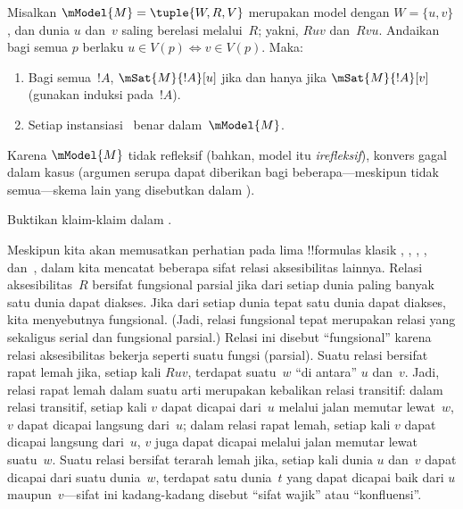 \documentclass[../../../include/open-logic-section]{subfiles}
\begin{document}
\begin{prop}
  Misalkan $\mModel{M}=\tuple{W,R,V}$ merupakan model dengan $W=\{u,v\}$,
  dan dunia $u$ dan~$v$ saling berelasi melalui~$R$; yakni, $Ruv$ dan~$Rvu$.
  Andaikan bagi semua $p$ berlaku $u\in V(p)\Leftrightarrow v\in V(p)$.
  Maka:
  \begin{enumerate}
  \item Bagi semua~$!A$, $\mSat{M}{!A}[u]$ jika dan hanya jika
    $\mSat{M}{!A}[v]$ (gunakan induksi pada~$!A$).
  \item Setiap instansiasi~ benar dalam~$\mModel{M}$.
  \end{enumerate}
  Karena $\mModel{M}$ tidak refleksif (bahkan, model itu
  \emph{irefleksif}), konvers  gagal dalam kasus
   (argumen serupa dapat diberikan bagi beberapa---meskipun tidak
  semua---skema lain yang disebutkan dalam ).
\end{prop}

\begin{prob}
  Buktikan klaim-klaim dalam .
\end{prob}

Meskipun kita akan memusatkan perhatian pada lima !!{formula}s klasik ,
, , , dan~, dalam  kita
mencatat beberapa sifat relasi aksesibilitas lainnya. Relasi aksesibilitas~$R$
bersifat fungsional parsial jika dari setiap dunia paling banyak satu dunia
dapat diakses. Jika dari setiap dunia tepat satu dunia dapat diakses, kita
menyebutnya fungsional. (Jadi, relasi fungsional tepat merupakan relasi yang
sekaligus serial dan fungsional parsial.) Relasi ini disebut ``fungsional''
karena relasi aksesibilitas bekerja seperti suatu fungsi (parsial). Suatu
relasi bersifat rapat lemah jika, setiap kali $Ruv$, terdapat suatu~$w$ ``di
antara'' $u$ dan~$v$. Jadi, relasi rapat lemah dalam suatu arti merupakan
kebalikan relasi transitif: dalam relasi transitif, setiap kali $v$ dapat
dicapai dari~$u$ melalui jalan memutar lewat~$w$, $v$ dapat dicapai langsung
dari~$u$; dalam relasi rapat lemah, setiap kali $v$ dapat dicapai langsung
dari~$u$, $v$ juga dapat dicapai melalui jalan memutar lewat suatu~$w$. Suatu
relasi bersifat terarah lemah jika, setiap kali dunia $u$ dan~$v$ dapat
dicapai dari suatu dunia~$w$, terdapat satu dunia~$t$ yang dapat dicapai baik
dari $u$ maupun~$v$---sifat ini kadang-kadang disebut ``sifat wajik'' atau
``konfluensi''.
\end{document}
